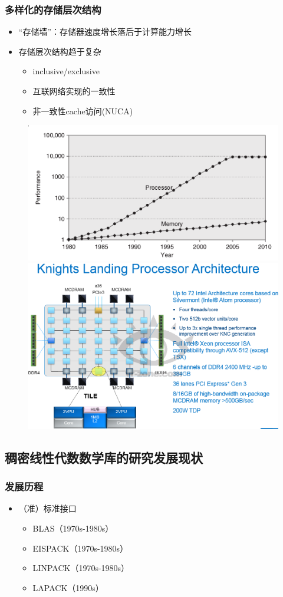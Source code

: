 \documentclass[aspectratio=169]{beamer}
\begin{document}
\begin{frame}
  \frametitle{多样化的存储层次结构}
  \begin{itemize}
  \item “存储墙”：存储器速度增长落后于计算能力增长 %
  \item 存储层次结构趋于复杂
    \begin{itemize}
    \item inclusive/exclusive
    \item 互联网络实现的一致性
    \item 非一致性cache访问(NUCA)
    \end{itemize}
  \end{itemize}
  \begin{figure}
    \includegraphics[width=.4\textwidth]{cpu-mem-gap}\hspace{1cm}
    \includegraphics[width=.4\textwidth]{knl}
  \end{figure}
\end{frame}

\subsection[研发现状]{稠密线性代数数学库的研究发展现状}

\begin{frame}
  \frametitle{发展历程}
  \begin{itemize}
  \item （准）标准接口
    \begin{itemize}             %
    \item BLAS（1970s-1980s）
    \item EISPACK（1970s-1980s）
    \item LINPACK（1970s-1980s）
    \item LAPACK（1990s）
    \end{itemize}
  \end{itemize}
\end{frame}
\end{document}
